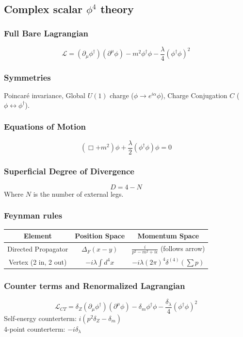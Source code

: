 \documentclass{article}
\begin{document}
\subsection{Complex scalar $\phi^4$ theory}
\subsubsection*{Full Bare Lagrangian}
\begin{equation}
    \mathcal{L} = (\partial_\mu \phi^\dagger)(\partial^\mu \phi) - m^2\phi^\dagger \phi - \frac{\lambda}{4}(\phi^\dagger \phi)^2
\end{equation}
\subsubsection*{Symmetries}
Poincar\'{e} invariance, Global $U(1)$ charge ($\phi \to e^{i\alpha}\phi$), Charge Conjugation $C$ ($\phi \leftrightarrow \phi^\dagger$).
\subsubsection*{Equations of Motion}
\begin{equation}
    (\Box + m^2)\phi + \frac{\lambda}{2}(\phi^\dagger \phi)\phi = 0
\end{equation}
\subsubsection*{Superficial Degree of Divergence}
\begin{equation}
    D = 4 - N
\end{equation}
Where $N$ is the number of external legs.
\subsubsection*{Feynman rules}
\begin{center}
\begin{tabular}{|c|c|c|}
\hline
\textbf{Element} & \textbf{Position Space} & \textbf{Momentum Space} \\ \hline
Directed Propagator & $\Delta_F(x-y)$ & $\frac{i}{p^2 - m^2 + i\epsilon}$ (follows arrow) \\ \hline
Vertex (2 in, 2 out) & $-i\lambda \int d^4x$ & $-i\lambda (2\pi)^4\delta^{(4)}(\sum p)$ \\ \hline
\end{tabular}
\end{center}
\subsubsection*{Counter terms and Renormalized Lagrangian}
\begin{equation}
    \mathcal{L}_{CT} = \delta_Z (\partial_\mu \phi^\dagger)(\partial^\mu \phi) - \delta_m \phi^\dagger \phi - \frac{\delta_\lambda}{4}(\phi^\dagger \phi)^2
\end{equation}
Self-energy counterterm: $i(p^2\delta_Z - \delta_m)$ \\
4-point counterterm: $-i\delta_\lambda$
\end{document}
